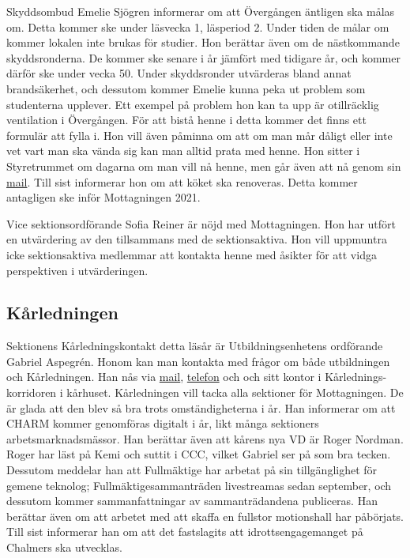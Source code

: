 \documentclass[hidelinks]{sektionsmote}
\begin{document}
Skyddsombud Emelie Sjögren informerar om att Övergången äntligen ska målas om.
Detta kommer ske under läsvecka 1, läsperiod 2.
Under tiden de målar om kommer lokalen inte brukas för studier.
Hon berättar även om de nästkommande skyddsronderna.
De kommer ske senare i år jämfört med tidigare år, och kommer därför ske under vecka 50. Under skyddsronder utvärderas bland annat brandsäkerhet, och dessutom kommer Emelie kunna peka ut problem som studenterna upplever.
Ett exempel på problem hon kan ta upp är otillräcklig ventilation i Övergången.
För att bistå henne i detta kommer det finns ett formulär att fylla i.
Hon vill även påminna om att om man mår dåligt eller inte vet vart man ska vända sig kan man alltid prata med henne.
Hon sitter i Styretrummet om dagarna om man vill nå henne, men går även att nå genom sin \href{mailto:styret.samo@ftek.se}{mail}.
Till sist informerar hon om att köket ska renoveras.
Detta kommer antagligen ske inför Mottagningen 2021.

Vice sektionsordförande Sofia Reiner är nöjd med Mottagningen.
Hon har utfört en utvärdering av den tillsammans med de sektionsaktiva.
Hon vill uppmuntra icke sektionsaktiva medlemmar att kontakta henne med åsikter för att vidga perspektiven i utvärderingen.

\subsection{Kårledningen}
Sektionens Kårledningskontakt detta läsår är Utbildningsenhetens ordförande Gabriel Aspegrén.
Honom kan man kontakta med frågor om både utbildningen och Kårledningen.
Han nås via \href{mailto:uo@chalmersstudentkar.se}{mail}, \href{tel:+46317723912}{telefon} och och sitt kontor i Kårlednings-korridoren i kårhuset.
Kårledningen vill tacka alla sektioner för Mottagningen.
De är glada att den blev så bra trots omständigheterna i år.
Han informerar om att CHARM kommer genomföras digitalt i år, likt många sektioners arbetsmarknadsmässor.
Han berättar även att kårens nya VD är Roger Nordman.
Roger har läst på Kemi och suttit i CCC, vilket Gabriel ser på som bra tecken.
Dessutom meddelar han att Fullmäktige har arbetat på sin tillgänglighet för gemene teknolog; Fullmäktigesammanträden livestreamas sedan september, och dessutom kommer sammanfattningar av sammanträdandena publiceras.
Han berättar även om att arbetet med att skaffa en fullstor motionshall har påbörjats.
Till sist informerar han om att det fastslagits att idrottsengagemanget på Chalmers ska utvecklas.
\end{document}
